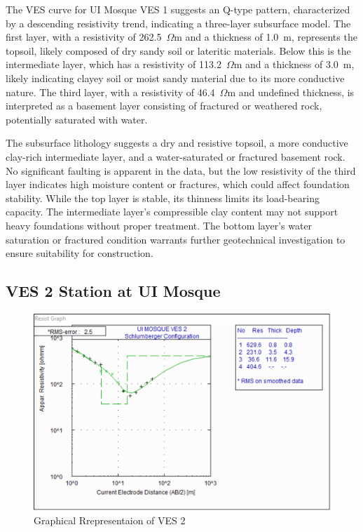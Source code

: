 \documentclass[12pt,a4paper]{report}
\begin{document}
The VES curve for UI Mosque VES 1 suggests an Q-type pattern, characterized by a descending resistivity trend, indicating a three-layer subsurface model. The first layer, with a resistivity of 262.5~$\Omega$m and a thickness of 1.0~m, represents the topsoil, likely composed of dry sandy soil or lateritic materials. Below this is the intermediate layer, which has a resistivity of 113.2~$\Omega$m and a thickness of 3.0~m, likely indicating clayey soil or moist sandy material due to its more conductive nature. The third layer, with a resistivity of 46.4~$\Omega$m and undefined thickness, is interpreted as a basement layer consisting of fractured or weathered rock, potentially saturated with water.

The subsurface lithology suggests a dry and resistive topsoil, a more conductive clay-rich intermediate layer, and a water-saturated or fractured basement rock. No significant faulting is apparent in the data, but the low resistivity of the third layer indicates high moisture content or fractures, which could affect foundation stability. While the top layer is stable, its thinness limits its load-bearing capacity. The intermediate layer’s compressible clay content may not support heavy foundations without proper treatment. The bottom layer’s water saturation or fractured condition warrants further geotechnical investigation to ensure suitability for construction.

\subsection{VES 2 Station at UI Mosque}

\begin{figure}[H]
    \centering
    \includegraphics[width=1.0\textwidth]{ui_ves2.png}
    \caption{Graphical Rrepresentaion of VES 2}
    \label{fig:VES_2_Curve}
\end{figure}
\end{document}
